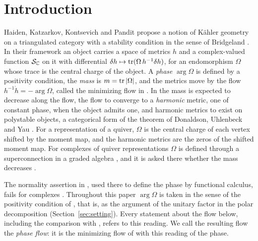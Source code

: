 \section{Introduction}\label{sec:intro}

Haiden, Katzarkov, Kontsevich and Pandit \cite{hkkp26} propose a notion of
K\"ahler geometry on a triangulated category with a stability condition in
the sense of Bridgeland \cite{bri07}. In their framework an object carries a
space of metrics $h$ and a complex-valued function $\mathcal S_{\mathbb C}$ on it with
differential $\delta h\mapsto\operatorname{tr}(\Omega\,h^{-1}\delta h)$, for an endomorphism
$\Omega$ whose trace is the central charge of the object. A \emph{phase}
$\arg\Omega$ is defined by a positivity condition, the \emph{mass} is
$m=\operatorname{tr}|\Omega|$, and the metrics move by the flow
$h^{-1}\dot h=-\arg\Omega$, called the minimizing flow in
\cite[\S4.1]{hkkp26}. In \cite[\S\S1,~4.1]{hkkp26} the mass is expected to
decrease along the flow, the flow to converge to a \emph{harmonic} metric,
one of constant phase, when the object admits one, and harmonic metrics to
exist on polystable objects, a categorical form of the theorem of Donaldson,
Uhlenbeck and Yau \cite{don85,uy86}. For a representation of a quiver,
$\Omega$ is the central charge of each vertex shifted by the moment map, and
the harmonic metrics are the zeros of the shifted moment map. For complexes
of quiver representations $\Omega$ is defined through a superconnection in a
graded algebra \cite[\S5.4]{hkkp26}, and it is asked there whether the mass
decreases \cite[Question~5.18]{hkkp26}.

The normality assertion in \cite[Lemma~5.16]{hkkp26}, used there to
define the phase by functional calculus, fails for complexes
\cite[Example~2.3]{wue26}. Throughout this paper $\arg\Omega$ is
taken in the sense of the positivity condition of \cite[\S4.2]{hkkp26}, that
is, as the argument of the unitary factor in the polar decomposition
(Section~\ref{sec:setting}). Every statement about the flow below, including
the comparison with \cite[Question~5.18]{hkkp26}, refers to this reading. We
call the resulting flow the \emph{phase flow}: it is the minimizing flow of
\cite[\S4.1]{hkkp26} with this reading of the phase.

